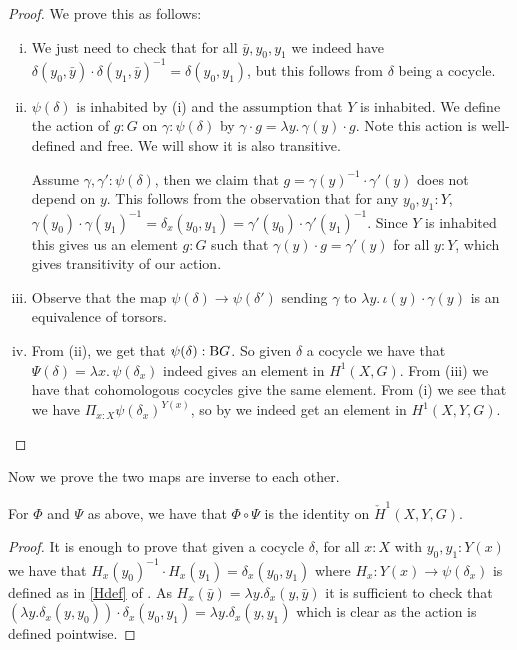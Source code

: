 \begin{proof}
We prove this as follows:

\begin{enumerate}[(i)]
\item We just need to check that for all $\bar{y},y_0,y_1$ we indeed have $\delta(y_0,\bar{y})\cdot\delta(y_1,\bar{y})^{-1} = \delta(y_0,y_1)$, but this follows from $\delta$ being a cocycle.

\item 
  $\psi(\delta)$ is inhabited by (i) and the assumption that $Y$ is inhabited. 
  We define the action of $g:G$ on $\gamma:\psi(\delta)$ by $\gamma\cdot g = \lambda y.\, \gamma(y)\cdot g$.
Note this action is well-defined and free. We will show it is also transitive.

Assume $\gamma,\gamma':\psi(\delta)$, then we claim that $g=\gamma(y)^{-1}\cdot\gamma'(y)$ does not depend on $y$. This follows from the observation that for any $y_0, y_1:Y$, $\gamma(y_0)\cdot\gamma(y_1)^{-1} = \delta_x(y_0,y_1) = \gamma'(y_0)\cdot\gamma'(y_1)^{-1}$. Since $Y$ is inhabited this gives us an element $g:G$ such that $\gamma(y)\cdot g = \gamma'(y)$ for all $y:Y$, which gives transitivity of our action. 

\item Observe that the map $\psi(\delta)\to \psi(\delta')$ sending $\gamma$ to $\lambda y.\, \iota(y)\cdot\gamma(y)$ is an equivalence of torsors.

\item From (ii), we get that $\psi(\delta):\mathrm{B} G$. So given $\delta$ a cocycle we have that $\Psi(\delta) = \lambda x.\, \psi(\delta_x)$ indeed gives an element in $H^1(X,G)$. From (iii) we have that cohomologous cocycles give the same element. From (i) we see that we have $\Pi_{x:X}\psi(\delta_x)^{Y(x)}$, so by  we indeed get an element in $H^1(X,Y,G)$. 
\end{enumerate}
\end{proof}

Now we prove the two maps are inverse to each other.

\begin{lemma}\label{PhiCircPsi}
  For $\Phi$ and $\Psi$ as above, we have that $\Phi\circ \Psi$ is the identity on $\check H^1(X,Y,G)$. 
\end{lemma}

\begin{proof}
  It is enough to prove that given a cocycle $\delta$, for all $x:X$ with $y_0,y_1:Y(x)$ we have that $H_x(y_0)^{-1}\cdot H_x(y_1) = \delta_x(y_0,y_1)$ where $H_x : Y(x)\to \psi(\delta_x)$ is defined as in \ref{Hdef} of . As $H_x(\bar{y}) = \lambda y.\delta_x(y,\bar{y})$ it is sufficient to check that $(\lambda y.\delta_x(y,y_0))\cdot\delta_x(y_0,y_1) = \lambda y.\delta_x(y,y_1)$ which is clear as the action is defined pointwise.
\end{proof}

